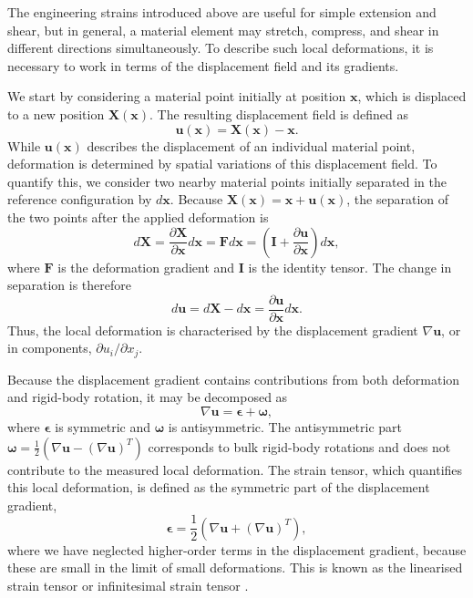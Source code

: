 The engineering strains introduced above are useful for simple extension and shear, but in general, a material element may stretch, compress, and shear in different directions simultaneously. To describe such local deformations, it is necessary to work in terms of the displacement field and its gradients.

We start by considering a material point initially at position $\bm{x}$, which is displaced to a new position $\bm{X}(\bm{x})$. The resulting displacement field is defined as
\[
    \bm{u}(\bm{x}) = \bm{X}(\bm{x}) - \bm{x}.
\]
While $\bm{u}(\bm{x})$ describes the displacement of an individual material point, deformation is determined by spatial variations of this displacement field. To quantify this, we consider two nearby material points initially separated in the reference configuration by $d\bm{x}$. Because $\bm{X}(\bm{x}) = \bm{x} + \bm{u}(\bm{x})$, the separation of the two points after the applied deformation is
\[
    d\bm{X} = \frac{\partial \bm{X}}{\partial \bm{x}} d\bm{x} = \bm{F} d\bm{x} = \left( \bm{I} + \frac{\partial \bm{u}}{\partial \bm{x}} \right) d\bm{x},
\]
where $\bm{F}$ is the deformation gradient and $\bm{I}$ is the identity tensor. The change in separation is therefore
\[
    d\bm{u} = d\bm{X} - d\bm{x} = \frac{\partial \bm{u}}{\partial \bm{x}} d\bm{x}.
\]
Thus, the local deformation is characterised by the displacement gradient $\nabla \bm{u}$, or in components, $\partial u_i/\partial x_j$.

Because the displacement gradient contains contributions from both deformation and rigid-body rotation, it may be decomposed as 
\[
    \nabla \bm{u} = \bm{\epsilon} + \bm{\omega},
\]
where $\bm{\epsilon}$ is symmetric and $\bm{\omega}$ is antisymmetric. The antisymmetric part $\bm{\omega} = \frac{1}{2}\left( \nabla \bm{u} - (\nabla \bm{u})^T \right)$ corresponds to bulk rigid-body rotations and does not contribute to the measured local deformation. The strain tensor, which quantifies this local deformation, is defined as the symmetric part of the displacement gradient,
\begin{equation}
\bm{\epsilon} = \frac{1}{2}\left( \nabla \bm{u} + (\nabla \bm{u})^T \right),
\label{eq:linearStrain}
\end{equation}
where we have neglected higher-order terms in the displacement gradient, because these are small in the limit of small deformations. This is known as the linearised strain tensor or infinitesimal strain tensor \cite{chandrasekharaiahContinuumMechanics2014}.

